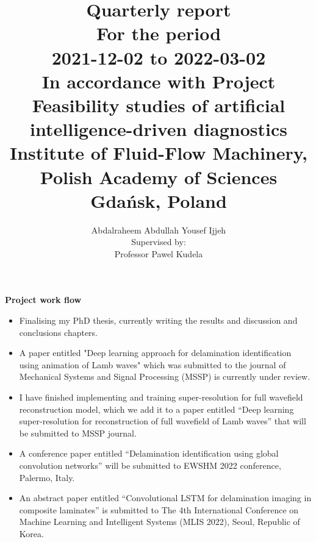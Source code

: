 \documentclass[11pt,a4paper]{report}
\author{Abdalraheem Abdullah Yousef Ijjeh \\
	Supervised by: \\
	Professor Pawel Kudela}
\title{\Huge Quarterly report \\
	\huge For the period \\ 2021-12-02 to 2022-03-02
	\\ \Large In accordance with Project\\
	Feasibility studies of artificial intelligence-driven diagnostics\\ Institute of Fluid-Flow Machinery, Polish Academy of Sciences
	\\ Gdańsk, Poland}
\begin{document}
	\date{}
	\maketitle
	\newpage
	{\huge \textbf{Project work flow}}
	\begin{itemize}
		\item Finalising my PhD thesis, currently writing the results and discussion and conclusions chapters.	
		\item A paper entitled "Deep learning approach for delamination identification using animation of Lamb waves" which was submitted to the journal of Mechanical Systems and Signal Processing (MSSP) is currently under review. 
		\item I have finished implementing and training super-resolution for full wavefield reconstruction model, which we add it to a paper entitled \enquote{Deep learning super-resolution for reconstruction of full wavefield of Lamb waves} that will be submitted to MSSP journal.
		\item A conference paper entitled \enquote{Delamination identification using global convolution networks} will be submitted to EWSHM 2022 conference, Palermo, Italy.
		\item An abstract paper entitled \enquote{Convolutional LSTM for delamination imaging in composite laminates} is submitted to 
		The 4th International Conference on Machine Learning and Intelligent Systems	(MLIS 2022), Seoul, Republic of Korea.
		
	\end{itemize}
%	
%	
\end{document}
